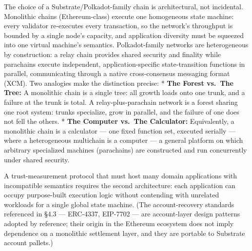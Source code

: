 \documentclass[
]{article}
\begin{document}
The choice of a Substrate/Polkadot-family chain is architectural, not
incidental. Monolithic chains (Ethereum-class) execute one homogeneous
state machine: every validator re-executes every transaction, so the
network's throughput is bounded by a single node's capacity, and
application diversity must be squeezed into one virtual machine's
semantics. Polkadot-family networks are heterogeneous by construction: a
relay chain provides shared security and finality while parachains
execute independent, application-specific state-transition functions in
parallel, communicating through a native cross-consensus messaging
format (XCM). Two analogies make the distinction precise: * \textbf{The
Forest vs.~The Tree:} A monolithic chain is a single tree: all growth
loads onto one trunk, and a failure at the trunk is total. A
relay-plus-parachain network is a forest sharing one root system: trunks
specialize, grow in parallel, and the failure of one does not fell the
others. * \textbf{The Computer vs.~The Calculator:} Equivalently, a
monolithic chain is a calculator --- one fixed function set, executed
serially --- where a heterogeneous multichain is a computer --- a
general platform on which arbitrary specialized machines (parachains)
are constructed and run concurrently under shared security.

A trust-measurement protocol that must host many domain applications
with incompatible semantics requires the second architecture: each
application can occupy purpose-built execution logic without contending
with unrelated workloads for a single global state machine. (The
account-recovery standards referenced in §4.3 --- ERC-4337, EIP-7702 ---
are account-layer design patterns adopted by reference; their origin in
the Ethereum ecosystem does not imply dependence on a monolithic
settlement layer, and they are portable to Substrate account pallets.)
\end{document}
